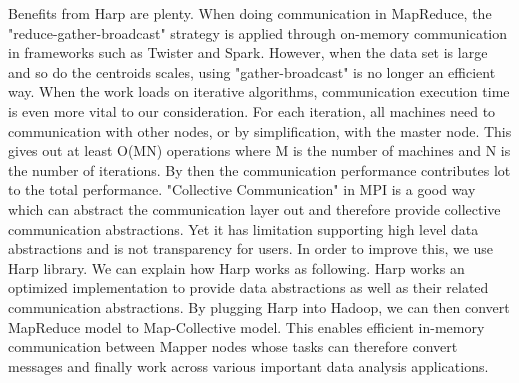 Benefits from Harp are plenty. When doing communication in MapReduce, the "reduce-gather-broadcast" strategy is applied through on-memory communication in frameworks such as Twister\cite{ekanayake2010twister} and Spark\cite{zaharia2010spark}. 
However, when the data set is large and so do the centroids scales, using "gather-broadcast" is no longer an efficient way. When the work loads on iterative algorithms, communication execution time is even more vital to our consideration. For each iteration, all machines need to communication with other nodes, or by simplification, with the master node. This gives out at least O(MN) operations where M is the number of machines and N is the number of iterations. By then the communication performance contributes lot to the total performance. "Collective Communication" in MPI is a good way which can abstract the communication layer out and therefore provide collective communication abstractions. 
Yet it has limitation supporting high level data abstractions and is not transparency for users. In order to improve this, we use Harp library. We can explain how Harp works as following. Harp works an optimized implementation to provide data abstractions as well as their related communication abstractions. By plugging Harp into Hadoop, we can then convert MapReduce model to Map-Collective model. This enables efficient in-memory communication between Mapper nodes whose tasks can therefore convert messages and finally work across various important data analysis applications.